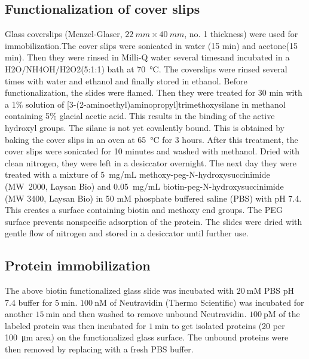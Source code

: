 \documentclass[journal=jacsat,manuscript=article]{achemso}
\begin{document}
\subsection{Functionalization of cover slips}
Glass coverslips (Menzel-Glaser, $22~mm \times 40~mm$, no. 1 thickness) were used for immobilization.The cover slips were sonicated in water (15 min) and acetone(15 min). Then they were rinsed in Milli-Q water several timesand incubated in a H2O/NH4OH/H2O2(5:1:1) bath at \SI{70}{\celsius}. The coverslips were rinsed several times with water and ethanol and finally stored in ethanol. Before functionalization, the slides were flamed. Then they were treated for 30 min with a 1\% solution of [3-(2-aminoethyl)aminopropyl]trimethoxysilane in methanol containing 5\% glacial acetic acid. This results in the binding of the active hydroxyl groups. The silane is not yet covalently bound. This is obtained by baking the cover slips in an oven at \SI{65}{\celsius} for 3 hours. After this treatment, the cover slips were sonicated for 10 minutes and washed with methanol. Dried with clean nitrogen, they were left in a desiccator overnight. The next day they were treated with a mixture of 5~mg/mL methoxy-peg-N-hydroxysuccinimide (MW~2000, Laysan Bio) and 0.05~mg/mL
biotin-peg-N-hydroxysuccinimide (MW 3400, Laysan Bio) in 50 mM phosphate buffered saline (PBS) with pH 7.4. This creates a surface containing biotin and methoxy end groups. The PEG surface prevents nonspecific adsorption of the protein. The slides were dried with gentle flow of nitrogen and stored in a desiccator until further use.
\subsection{Protein immobilization}
The above biotin functionalized glass slide was incubated with $20~$mM PBS pH 7.4 buffer for $5~$min. $100~$nM of Neutravidin (Thermo Scientific) was incubated for another $15~$min and then washed to remove unbound Neutravidin. $100~$pM of the labeled protein was then incubated for $1~$min to get isolated proteins (20 per \SI{100}{\micro\meter} area) on the functionalized glass surface. The unbound proteins were then removed by replacing with a fresh PBS buffer.
\end{document}
